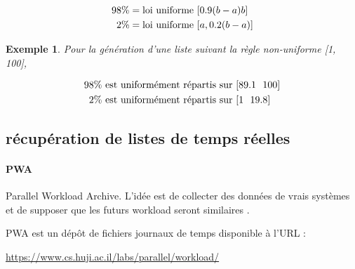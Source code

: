 \documentclass[a4paper,12pt]{report}
\theoremstyle{plain}				%
\newtheorem{example}{Exemple}
\theoremstyle{definition}				%
\begin{document}
\begin{align*}
	98 \%  &= \textnormal{loi uniforme } [0.9(b-a) b] \\
	2\%    &= \textnormal{loi uniforme } [a, 0.2(b-a)] 
\end{align*}

\begin{example}
Pour la génération d'une liste suivant la règle non-uniforme [1, 100], 

\begin{align*}
	98 \%  &\textnormal{ est uniformément répartis sur } [89.1~~ 100] \\
	2\%    &\textnormal{ est uniformément répartis sur } [1   ~~ 19.8] 
\end{align*}

\end{example}

 
\subsection{récupération de listes de temps réelles}\label{ssec:instancesGenerationListesTempsReelles}

\paragraph{PWA} Parallel Workload Archive. L'idée est de collecter des données de 
  vrais systèmes et de supposer que les futurs workload 
  seront similaires \cite{feitelson2014experience}.

   
PWA est un dépôt de fichiers journaux de temps disponible à 
  l'URL :
  
\url{https://www.cs.huji.ac.il/labs/parallel/workload/}
\end{document}
